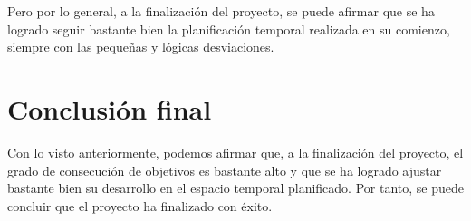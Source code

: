 Pero por lo general, a la finalización del proyecto, se puede afirmar que se ha logrado seguir bastante bien la planificación temporal realizada en su comienzo, siempre con las pequeñas y lógicas desviaciones. 

\section{Conclusión final}

Con lo visto anteriormente, podemos afirmar que, a la finalización del proyecto, el grado de consecución de objetivos es bastante alto y que se ha logrado ajustar bastante bien su desarrollo en el espacio temporal planificado. Por tanto, se puede concluir que el proyecto ha finalizado con éxito. 



